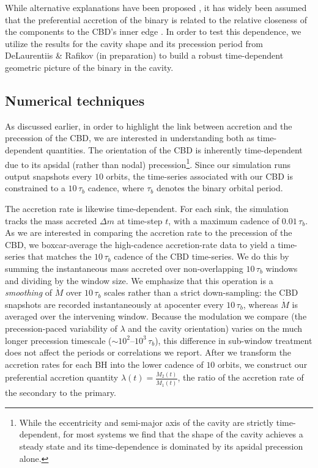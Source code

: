\documentclass[fleqn,usenatbib]{mnras}
\begin{document}
While alternative explanations have been proposed \citep{Artimowicz_83_og_polish}, it has widely been assumed that the preferential accretion of the binary is related to the relative closeness of the components to the CBD's inner edge \citep{Rafikov_16_accretion}. In order to test this dependence, we utilize the results for the cavity shape and its precession period from DeLaurentiis \& Rafikov (in preparation) to build a robust time-dependent geometric picture of the binary in the cavity.


\subsection{Numerical techniques}
As discussed earlier, in order to highlight the link between accretion and the precession of the CBD, we are interested in understanding both as time-dependent quantities. The orientation of the CBD is inherently time-dependent due to its apsidal (rather than nodal) precession\footnote{While the eccentricity and semi-major axis of the cavity are strictly time-dependent, for most systems we find that the shape of the cavity achieves a steady state and its time-dependence is dominated by its apsidal precession alone.}. Since our simulation runs output snapshots every $10$ orbits, the time-series associated with our CBD is constrained to a $10\,\tau_b$ cadence, where $\tau_b$ denotes the binary orbital period.


The accretion rate is likewise time-dependent. For each sink, the simulation tracks the mass accreted $\Delta m$ at time-step $t$, with a maximum cadence of $0.01\,\tau_b$. As we are interested in comparing the accretion rate to the precession of the CBD, we boxcar-average the high-cadence accretion-rate data to yield a time-series that matches the $10\,\tau_b$ cadence of the CBD time-series. We do this by summing the instantaneous mass accreted over non-overlapping $10\,\tau_b$ windows and dividing by the window size. We emphasize that this operation is a \textit{smoothing} of $\dot{M}$ over $10\,\tau_b$ scales rather than a strict down-sampling: the CBD snapshots are recorded instantaneously at apocenter every $10\,\tau_b$, whereas $\dot{M}$ is averaged over the intervening window. Because the modulation we compare (the precession-paced variability of $\lambda$ and the cavity orientation) varies on the much longer precession timescale ($\sim 10^2$--$10^3\,\tau_b$), this difference in sub-window treatment does not affect the periods or correlations we report. After we transform the accretion rates for each BH into the lower cadence of $10$ orbits, we construct our preferential accretion quantity $\lambda(t) = \frac{\dot{M}_2(t)}{\dot{M}_1(t)}$, the ratio of the accretion rate of the secondary to the primary.
\end{document}
